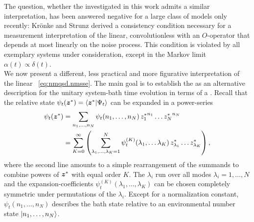 The question, whether the \NMSSE investigated in this work admits a similar interpretation, has been answered negative for a large class of models only recently:
Krönke and Strunz \cite{KrSt12_trajectories} derived a consistency condition necessary for a measurement interpretation of the linear, convolutionless \NMSSE with an $O$-operator that depends at most linearly on the noise process.
This condition is violated by all exemplary systems under consideration, except in the Markov limit $\alpha(t)\propto\delta(t)$.\\


We now present a different, less practical and more figurative interpretation of the linear \NMSSE~\ref{eq:nmqsd.nmsse}.
The main goal is to establish the \NMSSE as an alternative description for the unitary system-bath time evolution in terms of a .
Recall that the relative state $\psitz = \braket{\cc\zz}{\Psi_t}$ can be expanded in a power-series
\begin{align}
  \psitz &= \sum_{n_1,\ldots,n_N} \psit(n_1,\ldots,n_N) \, {\cc{z}_1}^{n_1} \ldots {\cc{z}_N}^{n_N} \nonumber \\
  &= \sum_{K=0}^\infty \left( \sum_{\lambda_1,\ldots,\lambda_K=1}^N \psi_t^{(K)}(\lambda_1,\ldots\lambda_K) \, \cc z_{\lambda_1} \ldots \cc z_{\lambda_K} \right),
  \label{eq:nmqsd.power_series}
\end{align}
where the second line amounts to a simple rearrangement of the summands to combine powers of ${\boldsymbol{z}}^*$ with equal order $K$.
The $\lambda_i$ run over all modes $\lambda_i=1,\ldots,N$ and the expansion-coefficients $\psi_t^{(K)}(\lambda_1,\ldots,\lambda_K)$ can be chosen completely symmetric under permutations of the $\lambda_i$.
Except for a normalization constant, $\psi_t(n_1,\ldots,n_N)$ describes the bath state relative to an environmental number state $| n_1,\ldots,n_N \rangle$.

